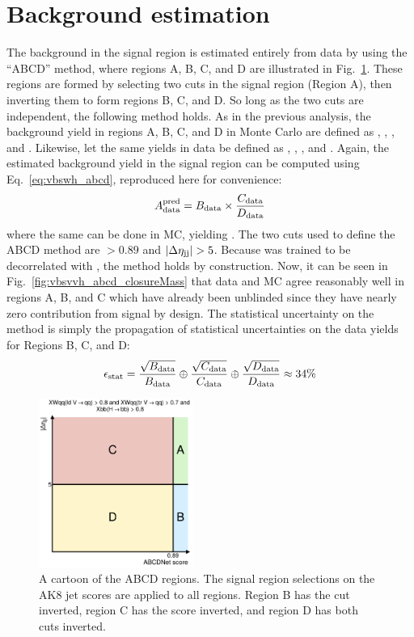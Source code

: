 \section{Background estimation}
The background in the signal region is estimated entirely from data by using the ``ABCD'' method, where regions A, B, C, and D are illustrated in Fig.~\ref{fig:vbsvvh_abcd}. %
These regions are formed by selecting two cuts in the signal region (Region A), then inverting them to form regions B, C, and D. 
So long as the two cuts are independent, the following method holds. 
As in the previous analysis, the background yield in regions A, B, C, and D in Monte Carlo are defined as \AMC, \BMC, \CMC, and \DMC.
Likewise, let the same yields in data be defined as  \Adata, \Bdata, \Cdata, and \Ddata.
Again, the estimated background yield in the signal region \AdataPred can be computed using Eq.~\ref{eq:vbswh_abcd}, reproduced here for convenience:
\begin{equation*}
    A_{\text{data}}^{\text{pred}} = B_{\text{data}}\times\frac{C_{\text{data}}}{D_{\text{data}}}
\end{equation*}
where the same can be done in MC, yielding \AMCPred. 
The two cuts used to define the ABCD method are \ABCDNet $> 0.89$ and $|\Delta\eta_{\mathrm{j}\mathrm{j}}| > 5$. 
Because \ABCDNet was trained to be decorrelated with \detajj, the method holds by construction. 
Now, it can be seen in Fig.~\ref{fig:vbsvvh_abcd_closureMass} that data and MC agree reasonably well in regions A, B, and C which have already been unblinded since they have nearly zero contribution from signal by design. 
The statistical uncertainty \Estat on the method is simply the propagation of statistical uncertainties on the data yields for Regions B, C, and D:
\begin{equation}\label{eq:vbsvvh_statUnc}
    \Estat = \frac{\sqrt{\Bdata}}{\Bdata} \oplus \frac{\sqrt{\Cdata}}{\Cdata} \oplus \frac{\sqrt{\Ddata}}{\Ddata} \approx 34\% %
\end{equation}

\begin{figure}[htb]
    \centering
    \includegraphics[width=0.45\textwidth]{fig/vbsvvh/ABCD_abcdnet_score_gt_0p89_vs_abs_deta_jj_gt_5p0.pdf}
    \caption[A cartoon of the ABCD regions]{
        A cartoon of the ABCD regions. 
        The signal region selections on the AK8 jet \ParticleNet scores are applied to all regions. 
        Region B has the \detajj cut inverted, region C has the \ABCDNet score inverted, and region D has both cuts inverted. 
    }
    \label{fig:vbsvvh_abcd}
\end{figure}

